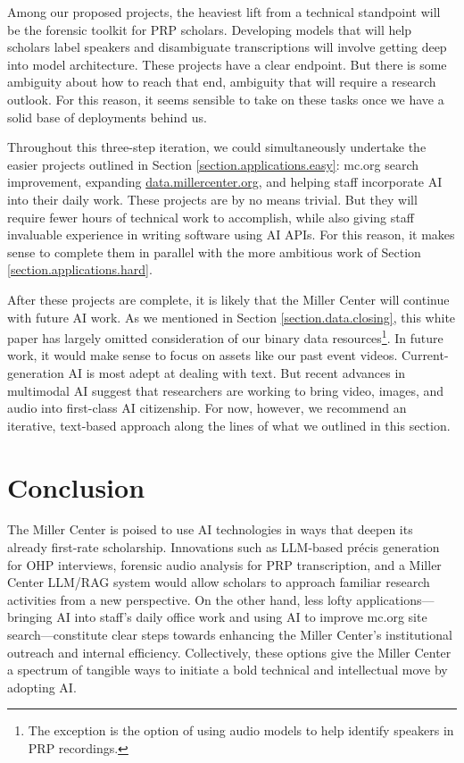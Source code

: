 \documentclass[12pt, oneside]{article}   	%
\begin{document}
Among our proposed projects, the heaviest lift from a technical standpoint will be the forensic toolkit for PRP scholars.  Developing models that will help scholars label speakers and disambiguate transcriptions will involve getting deep into model architecture.  These projects have a clear endpoint.  But there is some ambiguity about how to reach that end, ambiguity that will require a research outlook.  For this reason, it seems sensible to take on these tasks once we have a solid base of deployments behind us.

Throughout this three-step iteration, we could simultaneously undertake the easier projects outlined in Section \ref{section.applications.easy}: mc.org search improvement, expanding \href{https://data.millercenter.org}{data.millercenter.org}, and helping staff incorporate AI into their daily work.  These projects are by no means trivial.  But they will require fewer hours of technical work to accomplish, while also giving staff invaluable experience in writing software using AI APIs.  For this reason, it makes sense to complete them in parallel with the more ambitious work of Section \ref{section.applications.hard}.

After these projects are complete, it is likely that the Miller Center will continue with future AI work.  As we mentioned in Section \ref{section.data.closing}, this white paper has largely omitted consideration of our binary data resources\footnote{The exception is the option of using audio models to help identify speakers in PRP recordings.}.  In future work, it would make sense to focus on assets like our past event videos.  Current-generation AI is most adept at dealing with text.  But recent advances in multimodal AI suggest that researchers are working to bring video, images, and audio into first-class AI citizenship.  For now, however, we recommend an iterative, text-based approach along the lines of what we outlined in this section.


\section{Conclusion}\label{section.conclusion}
The Miller Center is poised to use AI technologies in ways that deepen its already first-rate scholarship.  Innovations such as LLM-based pr\'{e}cis generation for OHP interviews, forensic audio analysis for PRP transcription, and a Miller Center LLM/RAG system would allow scholars to approach  familiar research activities from a new perspective.  On the other hand, less lofty applications---bringing AI into staff's daily office work and using AI to improve mc.org site search---constitute clear steps towards enhancing the Miller Center's institutional outreach and internal efficiency.  Collectively, these options give the Miller Center a spectrum of tangible ways to initiate a bold technical and intellectual move by adopting AI.
\end{document}
